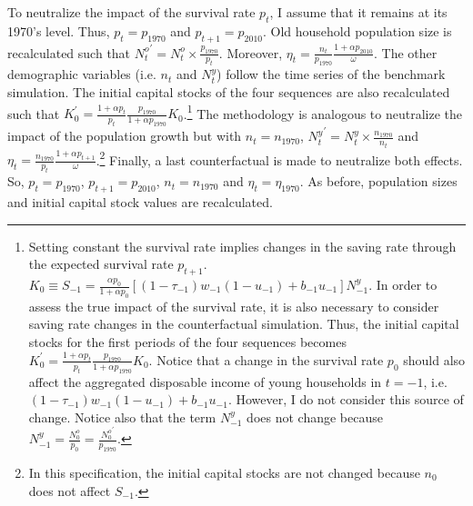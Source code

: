 To neutralize the impact of the survival rate $p_t$, I assume that it remains at its 1970's level. Thus, $p_t = p_{1970}$ and $p_{t+1} = p_{2010}$. Old household population size is recalculated such that ${N^o_t}^\prime = N_t^o\times\frac{p_{1970}}{p_t}$. Moreover, $\eta_t = \frac{n_t}{p_{1970}}\frac{1+\alpha p_{2010}}{\omega}$.
The other demographic variables (i.e. $n_t$ and $N^y_t$) follow the time series of the benchmark simulation. The initial capital stocks of the four sequences are also recalculated such that $K_0^\prime = \frac{1+\alpha p_t}{p_t}\frac{p_{1970}}{1+\alpha p_{1970}} K_0$.\footnote{Setting constant the survival rate implies changes in the saving rate through the expected survival rate $p_{t+1}$. $K_0 \equiv S_{-1} = \frac{\alpha p_0}{1+\alpha p_0}\left[(1-\tau_{-1})w_{-1}(1-u_{-1})+b_{-1}u_{-1}\right]N_{-1}^y$. In order to assess the true impact of the survival rate, it is also necessary to consider saving rate changes in the counterfactual simulation. Thus, the initial capital stocks for the first periods of the four sequences becomes $K_0^\prime = \frac{1+\alpha p_t}{p_t}\frac{p_{1970}}{1+\alpha p_{1970}} K_0$. Notice that a change in the survival rate $p_0$ should also affect the aggregated disposable income of young households in $t=-1$, i.e. $(1-\tau_{-1})w_{-1}(1-u_{-1})+b_{-1}u_{-1}$. However, I do not consider this source of change. Notice also that the term $N_{-1}^y$ does not change because $N_{-1}^y = \frac{N_0^o}{p_0} = \frac{{N_0^o}^\prime}{p_{1970}}$.} The methodology is analogous to neutralize the impact of the population growth but with $n_t = n_{1970}$, ${N_t^y}^\prime = N_t^y\times\frac{n_{1970}}{n_t}$ and $\eta_t = \frac{n_{1970}}{p_t}\frac{1+\alpha p_{t+1}}{\omega}$.\footnote{In this specification, the initial capital stocks are not changed because $n_0$ does not affect $S_{-1}$.} Finally, a last counterfactual is made to neutralize both effects. So, $p_t = p_{1970}$, $p_{t+1} = p_{2010}$, $n_t = n_{1970}$ and $\eta_t = \eta_{1970}$. As before, population sizes and initial capital stock values are recalculated.

